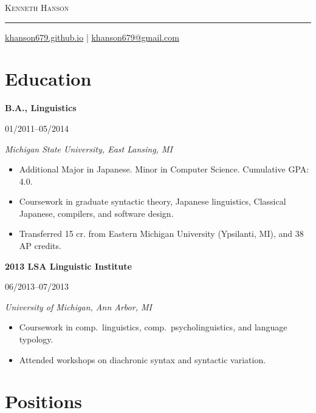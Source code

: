 \documentclass[10pt,oneside]{article}
\makeatletter
\newcommand{\name}{Kenneth Hanson}
\newcommand{\email}{khanson679@gmail.com}
\newcommand{\website}{khanson679.github.io}
\newcommand{\bigname}{%
	{\centering\scshape\Huge \name \par}
}
\newcommand{\contactinfo}{%
	{\raggedleft\small \href{http://\website}{\website} | \href{mailto:\email}{\email} \par}
}
\newcommand{\topheading}{%
	\bigname
	\rule{\textwidth}{1pt} \par
	\contactinfo
}
\newcommand{\ressection}[1]{
	\vspace{-12pt}
	\section*{#1}
}
\newcommand{\resbigitem}[4]{
	\item \parbox[t]{0.8\textwidth}{\textbf{#1}} \hfill #2 \\
		\parbox[t]{0.8\textwidth}{\textit{#3}} \hfill \textit{#4}
}
\makeatother
\begin{document}
\topheading

\ressection{Education}

\begin{reslist}
	\resbigitem{B.A., Linguistics}
		{01/2011--05/2014}
		{Michigan State University, East Lansing, MI}
		{}
	\begin{itemize}
		\item Additional Major in Japanese. Minor in Computer Science. Cumulative GPA: 4.0.
		\item Coursework in graduate syntactic theory, Japanese linguistics, Classical Japanese, compilers, and software design.
		\item Transferred 15 cr. from Eastern Michigan University (Ypsilanti, MI), and 38 AP credits.
	\end{itemize}
	
	\resbigitem{2013 LSA Linguistic Institute}
		{06/2013--07/2013}
		{University of Michigan, Ann Arbor, MI}
		{}
	\begin{itemize}
		\item Coursework in comp.\ linguistics, comp.\ psycholinguistics, and language typology.
		\item Attended workshops on diachronic syntax and syntactic variation.
	\end{itemize}
\end{reslist}


\ressection{Positions}
\end{document}
